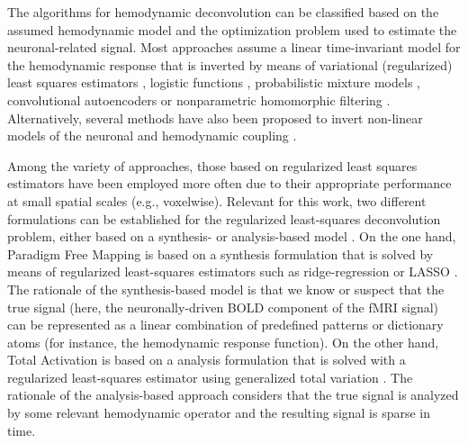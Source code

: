 The algorithms for hemodynamic deconvolution can be classified based on the
assumed hemodynamic model and the optimization problem used to estimate the
neuronal-related signal. Most approaches assume a linear time-invariant model
for the hemodynamic response that is inverted by means of variational
(regularized) least squares estimators
\citep{Glover1999DeconvolutionImpulseResponse,Gitelman2003Modelingregionalpsychophysiologic,
Gaudes2010Detectioncharacterizationsingle,Gaudes2012Structuredsparsedeconvolution,
Gaudes2013Paradigmfreemapping,CaballeroGaudes2019deconvolutionalgorithmmulti,
HernandezGarcia2011Neuronaleventdetection,Karahanoglu2013TotalactivationfMRI,
Cherkaoui2019Sparsitybasedblind,
Huetel2021Hemodynamicmatrixfactorization,Costantini2022Anisotropic4DFiltering},
logistic functions
\citep{Bush2013Decodingneuralevents,Bush2015deconvolutionbasedapproach,
Loula2018DecodingfMRIactivity}, probabilistic mixture models
\citep{Pidnebesna2019EstimatingSparseNeuronal}, convolutional autoencoders
\citep{Huetel2018NeuralActivationEstimation} or nonparametric homomorphic
filtering \citep{Sreenivasan2015NonparametricHemodynamicDeconvolution}.
Alternatively, several methods have also been proposed to invert non-linear
models of the neuronal and hemodynamic coupling
\citep{Riera2004statespacemodel,Penny2005Bilineardynamicalsystems,Friston2008DEMvariationaltreatment,
Havlicek2011Dynamicmodelingneuronal,Aslan2016Jointstateparameter,
Madi2017HybridCubatureKalman,RuizEuler2018NonlinearDeconvolutionSampling}.

Among the variety of approaches, those based on regularized least squares
estimators have been employed more often due to their appropriate performance at
small spatial scales (e.g., voxelwise). Relevant for this work, two different
formulations can be established for the regularized least-squares deconvolution
problem, either based on a synthesis- or analysis-based model
\citep{Elad2007Analysisversussynthesis,Ortelli2019Synthesisanalysistotal}. On
the one hand, Paradigm Free Mapping is based on a synthesis formulation that is solved
by means of regularized least-squares estimators such as ridge-regression
\citep{Gaudes2010Detectioncharacterizationsingle} or LASSO
\citep{Gaudes2013Paradigmfreemapping}. The rationale of the synthesis-based
model is that we know or suspect that the true signal (here, the
neuronally-driven BOLD component of the fMRI signal) can be represented as a
linear combination of predefined patterns or dictionary atoms (for instance, the
hemodynamic response function). On the other hand, Total Activation is based on
a analysis formulation that is solved with a regularized least-squares estimator
using generalized total variation
\citep{Karahanoglu2011SignalProcessingApproach,Karahanoglu2013TotalactivationfMRI}.
The rationale of the analysis-based approach considers that the true signal is
analyzed by some relevant hemodynamic operator
\citep{Khalidov2011ActiveletsWaveletssparse} and the resulting signal is sparse
in time.

